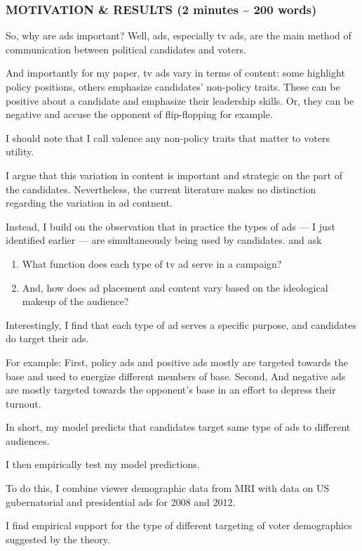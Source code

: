 \documentclass[12pt]{article}
\theoremstyle{plain}
\theoremstyle{plain}
\theoremstyle{plain}
\theoremstyle{plain}
\theoremstyle{plain}
\theoremstyle{plain}
\begin{document}
\subsubsection{MOTIVATION \& RESULTS (2 minutes \textasciitilde{} 200 words)}
\label{sec:org29925f0}

So, why are ads important?
Well, ads, especially tv ads, are the main method of communication between political candidates and voters.

And importantly for my paper, tv ads vary in terms of content:
some highlight policy positions,
others emphasize candidates' non-policy traits. 
These can be positive about a candidate and emphasize their leadership skills.
Or, they can be negative and accuse the opponent of flip-flopping for example.

I should note that I call valence any non-policy traits that matter to voters utility.

I argue that this variation in content is important and strategic on the part of the candidates.
Nevertheless, the current literature makes no distinction regarding the variation in ad contnent.

Instead, I build on the observation that in practice the types of ads --- I just identified earlier --- are simultaneously being used by candidates.
and ask
\begin{enumerate}
\item What function does each type of tv ad serve in a campaign?
\item And, how does ad placement and content vary based on the ideological makeup of the audience?
\end{enumerate}

Interestingly, I find that each type of ad serves a specific purpose, and candidates do target their ads.

For example:
First, policy ads and positive ads mostly are targeted towards the base and used to energize different members of base.
Second, And negative ads are mostly targeted towards the opponent's base in an effort to depress their turnout.

In short, my model predicts that candidates target same type of ads to different audiences.

I then empirically test my model predictions.

To do this, I combine viewer demographic data from MRI with data on US gubernatorial and presidential ads for 2008 and 2012.

I find empirical support for the type of different targeting of voter demographics suggested by the theory.
\end{document}
